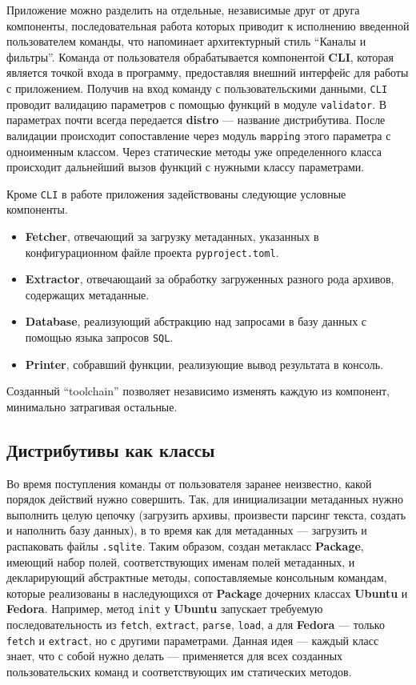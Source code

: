 Приложение можно разделить на отдельные, независимые друг от друга компоненты, последовательная работа которых приводит к исполнению введенной пользователем команды, что напоминает архитектурный стиль \enquote{Каналы и фильтры}.
Команда от пользователя обрабатывается компонентой \textbf{CLI}, которая является точкой входа в программу, предоставляя внешний интерфейс для работы с приложением.
Получив на вход команду с пользовательскими данными, \texttt{CLI} проводит валидацию параметров с помощью функций в модуле \texttt{validator}. В параметрах почти всегда передается \textbf{distro} --- название дистрибутива. После валидации происходит сопоставление через модуль \texttt{mapping} этого параметра с одноименным классом.
Через статические методы уже определенного класса происходит дальнейший вызов функций с нужными классу параметрами.

Кроме \texttt{CLI} в работе приложения задействованы следующие условные компоненты.
\begin{itemize}
	\item \textbf{Fetcher}, отвечающий за загрузку метаданных, указанных в конфигурационном файле проекта \texttt{pyproject.toml}.
	\item \textbf{Extractor}, отвечающаий за обработку загруженных разного рода архивов, содержащих метаданные.
	\item \textbf{Database}, реализующий абстракцию над запросами в базу данных с помощью языка запросов \texttt{SQL}.
	\item \textbf{Printer}, собравший функции, реализующие вывод результата в консоль.
\end{itemize}

Созданный \enquote{toolchain} позволяет независимо изменять каждую из компонент, минимально затрагивая остальные.

\subsection{Дистрибутивы как классы}
Во время поступления команды от пользователя заранее неизвестно, какой порядок действий нужно совершить. Так, для инициализации метаданных {\ubuntu} нужно выполнить целую цепочку (загрузить архивы, произвести парсинг текста, создать и наполнить базу данных), в то время как для метаданных {\fedora} --- загрузить и распаковать файлы \texttt{.sqlite}.
Таким образом, создан метакласс \textbf{Package}, имеющий набор полей, соответствующих именам полей метаданных, и декларирующий абстрактные методы, сопоставляемые консольным командам, которые реализованы в наследующихся от \textbf{Package} дочерних классах \textbf{Ubuntu} и \textbf{Fedora}.
Например, метод \texttt{init} у \textbf{Ubuntu} запускает требуемую последовательность из \texttt{fetch}, \texttt{extract}, \texttt{parse}, \texttt{load}, а для \textbf{Fedora} --- только \texttt{fetch} и \texttt{extract}, но с другими параметрами.
Данная идея --- каждый класс знает, что с собой нужно делать --- применяется для всех созданных пользовательских команд и соответствующих им статических методов.
